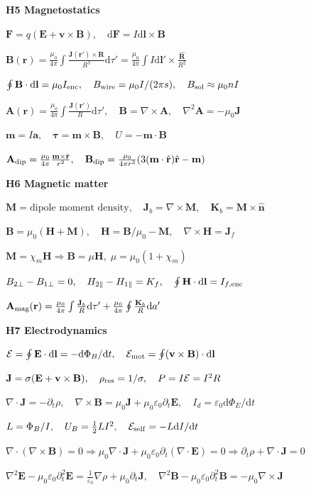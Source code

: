 \documentclass[a4paper]{article}
\newcommand{\E}{\mathbf{E}}
\newcommand{\B}{\mathbf{B}}
\newcommand{\HH}{\mathbf{H}}
\newcommand{\J}{\mathbf{J}}
\newcommand{\A}{\mathbf{A}}
\newcommand{\n}{\hat{\mathbf{n}}}
\newcommand{\dd}{\mathrm{d}}
\newcommand{\ep}{\varepsilon}
\newcommand{\secblock}[1]{\vspace{0.08ex}\textbf{#1}\par}
\newcommand{\eqline}[1]{\(#1\)\par}
\begin{document}
\begin{multicols*}{6}
\secblock{H5 Magnetostatics}
\eqline{\mathbf F=q(\E+\mathbf v\times\B),\quad \dd\mathbf F=I\dd\mathbf l\times\B}
\eqline{\B(\mathbf r)=\frac{\mu_0}{4\pi}\int\frac{\J(\mathbf r')\times\mathbf R}{R^3}\dd\tau'=\frac{\mu_0}{4\pi}\int I\dd\mathbf l'\times\frac{\hat{\mathbf R}}{R^2}}
\eqline{\oint\B\cdot\dd\mathbf l=\mu_0I_{\rm enc},\quad B_{\rm wire}=\mu_0I/(2\pi s),\quad B_{\rm sol}\approx\mu_0nI}
\eqline{\A(\mathbf r)=\frac{\mu_0}{4\pi}\int\frac{\J(\mathbf r')}{R}\dd\tau',\quad \B=\nabla\times\A,\quad \nabla^2\A=-\mu_0\J}
\eqline{\mathbf m=I\mathbf a,\quad \boldsymbol\tau=\mathbf m\times\B,\quad U=-\mathbf m\cdot\B}
\eqline{\A_{\rm dip}=\frac{\mu_0}{4\pi}\frac{\mathbf m\times\hat{\mathbf r}}{r^2},\quad \B_{\rm dip}=\frac{\mu_0}{4\pi r^3}(3(\mathbf m\cdot\hat{\mathbf r})\hat{\mathbf r}-\mathbf m)}

\secblock{H6 Magnetic matter}
\eqline{\mathbf M=\text{dipole moment density},\quad \J_b=\nabla\times\mathbf M,\quad \mathbf K_b=\mathbf M\times\n}
\eqline{\B=\mu_0(\HH+\mathbf M),\quad \HH=\B/\mu_0-\mathbf M,\quad \nabla\times\HH=\J_f}
\eqline{\mathbf M=\chi_m\HH\Rightarrow\B=\mu\HH,\;\mu=\mu_0(1+\chi_m)}
\eqline{B_{2\perp}-B_{1\perp}=0,\quad H_{2\parallel}-H_{1\parallel}=K_f,\quad \oint\HH\cdot\dd\mathbf l=I_{f,\rm enc}}
\eqline{\A_{\rm mag}(\mathbf r)=\frac{\mu_0}{4\pi}\int\frac{\J_b}{R}\dd\tau'+\frac{\mu_0}{4\pi}\oint\frac{\mathbf K_b}{R}\dd a'}

\secblock{H7 Electrodynamics}
\eqline{\mathcal E=\oint\E\cdot\dd\mathbf l=-\dd\Phi_B/\dd t,\quad \mathcal E_{\rm mot}=\oint(\mathbf v\times\B)\cdot\dd\mathbf l}
\eqline{\J=\sigma(\E+\mathbf v\times\B),\quad \rho_{\rm res}=1/\sigma,\quad P=I\mathcal E=I^2R}
\eqline{\nabla\cdot\J=-\partial_t\rho,\quad \nabla\times\B=\mu_0\J+\mu_0\ep_0\partial_t\E,\quad I_d=\ep_0\dd\Phi_E/\dd t}
\eqline{L=\Phi_B/I,\quad U_B=\tfrac12LI^2,\quad \mathcal E_{\rm self}=-L\dd I/\dd t}
\eqline{\nabla\cdot(\nabla\times\B)=0\Rightarrow \mu_0\nabla\cdot\J+\mu_0\ep_0\partial_t(\nabla\cdot\E)=0\Rightarrow \partial_t\rho+\nabla\cdot\J=0}
\eqline{\nabla^2\E-\mu_0\ep_0\partial_t^2\E=\frac{1}{\ep_0}\nabla\rho+\mu_0\partial_t\J,
 \quad \nabla^2\B-\mu_0\ep_0\partial_t^2\B=-\mu_0\nabla\times\J}

\end{multicols*}

\newpage
\end{document}
